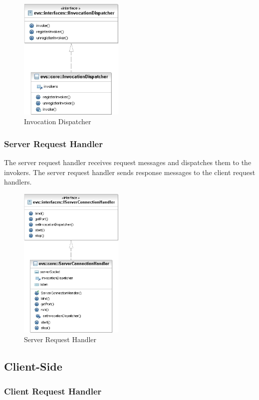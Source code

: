 \begin{figure}[ht!]
	\centering\includegraphics[width=5cm]{uml/InvocationDispatcher.jpg} 
	\caption{Invocation Dispatcher}
	\label{fig:dispatcher}
\end{figure}


\subsubsection{Server Request Handler}

The server request handler receives request messages and dispatches them to the invokers.
The server request handler sends response messages to the client request handlers.

\begin{figure}[ht!]
	\centering\includegraphics[width=5cm]{uml/ServerRequestHandler.jpg} 
	\caption{Server Request Handler}
	\label{fig:serverrequesthandler}
\end{figure}

\subsection{Client-Side}

\subsubsection{Client Request Handler}

